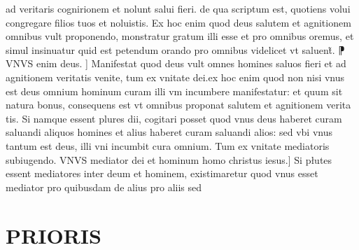 \documentclass{article}
\begin{document}
\begin{pages}
ad veritaris cognirionem et nolunt salui fieri. de qua scriptum est, quotiens volui congregare filios tuos et noluistis. Ex hoc enim quod deus salutem et agnitionem omnibus vult proponendo, monstratur gratum illi esse et pro omnibus oremus, et simul insinuatur quid est petendum orando pro omnibus  videlicet vt saluent̃. ⁋ VNVS enim deus. ] Manifestat quod deus vult omnes homines saluos fieri et ad agnitionem veritatis venite, tum ex vnitate dei.ex hoc enim quod non nisi vnus est deus  omnium hominum curam illi vm incumbere manifestatur: et quum sit natura bonus, consequens est vt omnibus proponat salutem et agnitionem verita tis. Si namque  essent plures dii, cogitari posset quod vnus deus haberet curam saluandi aliquos homines  et alius haberet curam saluandi alios: sed vbi vnus tantum est deus, illi vni incumbit cura omnium. Tum ex vnitate mediatoris  subiugendo. VNVS mediator dei et hominum homo christus iesus.] Si płutes essent mediatores inter deum et hominem, existimaretur quod vnus esset mediator pro quibusdam de alius pro aliis sed  \pend
\section*{PRIORIS }

\end{pages}
\end{document}
